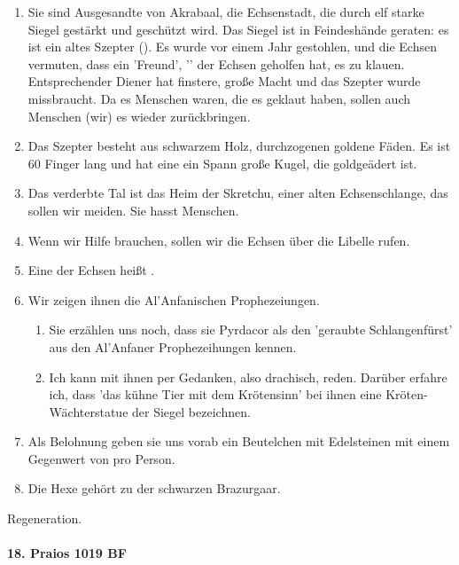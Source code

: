 \begin{enumerate}
\item Sie sind Ausgesandte von Akrabaal, die Echsenstadt, die durch elf starke Siegel gestärkt und geschützt wird. Das Siegel  ist in Feindeshände geraten: es ist ein altes Szepter (). Es wurde vor einem Jahr gestohlen, und die Echsen vermuten, dass ein 'Freund', '' der Echsen geholfen hat, es zu klauen. Entsprechender Diener hat finstere, große Macht und das Szepter wurde missbraucht. Da es Menschen waren, die es geklaut haben, sollen auch Menschen (wir) es wieder zurückbringen. 
\item Das Szepter besteht aus schwarzem Holz, durchzogenen goldene Fäden. Es ist 60 Finger lang und hat eine ein Spann große Kugel, die goldgeädert ist. 
\item Das verderbte Tal ist das Heim der Skretchu, einer alten Echsenschlange, das sollen wir meiden. Sie hasst Menschen. 
\item Wenn wir Hilfe brauchen, sollen wir die Echsen über die Libelle rufen.
\item Eine der Echsen heißt . 
\item Wir zeigen ihnen die Al'Anfanischen Prophezeiungen. 
  \begin{enumerate}
  \item  Sie erzählen uns noch, dass sie Pyrdacor als den 'geraubte Schlangenfürst' aus den Al'Anfaner Prophezeihungen kennen. 
\item Ich kann mit ihnen per Gedanken, also drachisch, reden. Darüber erfahre ich, dass 'das kühne Tier mit dem Krötensinn' bei ihnen eine Kröten-Wächterstatue der Siegel bezeichnen. 
  \end{enumerate}
\item Als Belohnung geben sie uns vorab ein Beutelchen mit Edelsteinen mit einem Gegenwert von  pro Person. 
\item Die Hexe  gehört zu der schwarzen Brazurgaar. 
\end{enumerate}

 Regeneration. 
\paragraph{18. Praios 1019 BF}

